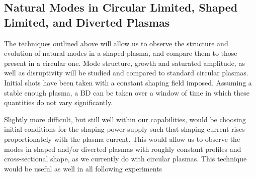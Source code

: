 \documentclass[aps,prl,twocolumn,superscriptaddress,groupedaddress]{revtex4}  %
\begin{document}
	\subsection{Natural Modes in Circular Limited, Shaped Limited, and Diverted Plasmas}		
	The techniques outlined above will allow us to observe the structure and evolution of natural modes in a shaped plasma, and compare them to those present in a circular one.  Mode structure, growth and saturated amplitude, as well as disruptivity will be studied and compared to standard circular plasmas. Initial shots have been taken with a constant shaping field imposed.  Assuming a stable enough plasma, a BD can be taken over a window of time in which these quantities do not vary significantly.\par
	Slightly more difficult, but still well within our capabilities, would be choosing initial conditions for the shaping power supply such that shaping current rises proportionately with the plasma current.  This would allow us to observe the modes in shaped and/or diverted plasmas with roughly constant profiles and cross-sectional shape, as we currently do with circular plasmas.  This technique would be useful as well in all following experiments\par
\end{document}
